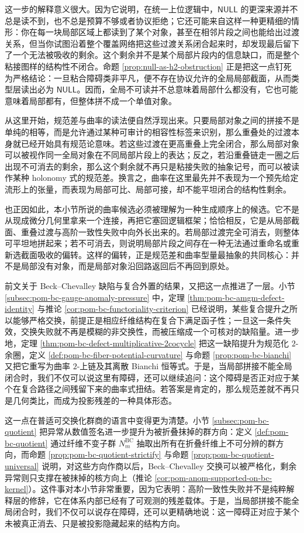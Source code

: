 这一步的解释意义很大。因为它说明，在统一上位逻辑中，\(\mathsf{NULL}\) 的更深来源并不总是读不到，也不总是预算不够或者协议拒绝；它还可能来自这样一种更精细的情形：你在每一块局部区域上都读到了某个对象，甚至在相邻片段之间也能给出过渡关系，但当你试图沿着整个覆盖网络把这些过渡关系闭合起来时，却发现最后留下了一个无法被吸收的剩余。这个剩余并不是某个局部片段内的信息缺口，而是整个粘接图样的结构性不闭合。命题 \ref{prop:null-as-h2-obstruction} 正是把这一点钉死为严格结论：一旦粘合障碍类非平凡，便不存在协议允许的全局局部截面，从而类型层读出必为 \(\mathsf{NULL}\)。因而，全局不可读并不总意味着局部什么都没有，它也可能意味着局部都有，但整体拼不成一个单值对象。

从这里开始，规范差与曲率的读法便自然浮现出来。只要局部对象之间的拼接不是单纯的相等，而是允许通过某种可审计的相容性标签来识别，那么重叠处的过渡本身就已经开始具有规范论意味。若这些过渡在更高重叠上完全闭合，那么局部对象可以被视作同一全局对象在不同局部片段上的表达；反之，若沿重叠链走一圈之后出现不可消去的剩余，那么这个剩余就不再只是粘接失败的抽象记号，而可以被读作某种 holonomy 式的规范差。换言之，曲率在这里最先并不表现为一个预先给定流形上的张量，而表现为局部可比、局部可接，却不能平坦闭合的结构性剩余。

也正因如此，本小节所说的曲率候选必须被理解为一种生成顺序上的候选。它不是从现成微分几何里拿来一个连接，再把它塞回逻辑框架；恰恰相反，它是从局部截面、重叠过渡与高阶一致性失败中向外长出来的。若局部过渡完全可消去，则整体可平坦地拼起来；若不可消去，则说明局部片段之间存在一种无法通过重命名或重新选截面吸收的偏转。这样的偏转，正是规范差和曲率型量最抽象的共同核心：并不是局部没有对象，而是局部对象沿回路返回后不再回到原处。

前文关于 Beck--Chevalley 缺陷与复合外置的结果，又把这一点推进了一层。小节 \ref{subsec:pom-bc-gauge-anomaly-pressure} 中，定理 \ref{thm:pom-bc-amgm-defect-identity} 与推论 \ref{cor:pom-bc-functoriality-criterion} 已经说明，某些复合提升之所以能够严格交换，前提正是相应纤维结构在复合下满足函子性；一旦这一条件失效，交换失败就不再是模糊的非交换性，而被压缩成一个可核对的缺陷量。进一步地，定理 \ref{thm:pom-bc-defect-multiplicative-2cocycle} 把这一缺陷提升为规范化 \(2\)-余圈，定义 \ref{def:pom-bc-fiber-potential-curvature} 与命题 \ref{prop:pom-bc-bianchi} 又把它重写为曲率 \(2\)-上链及其离散 Bianchi 恒等式。于是，当局部拼接不能全局闭合时，我们不仅可以说这里有障碍，还可以继续追问：这个障碍是否正对应于某个在复合路径之间残留下来的曲率式扭结。若答案是肯定的，那么规范差就不再只是几何类比，而成为投影残差的一种具体形态。

这一点在普适可交换化群商的语言中变得更为清楚。小节 \ref{subsec:pom-bc-quotient} 把异常从数值签名进一步提升为被折叠抹掉的群方向：定义 \ref{def:pom-bc-quotient} 通过纤维不变子群 \(N_m^{\mathrm{BC}}\) 抽取出所有在折叠纤维上不可分辨的群方向，而命题 \ref{prop:pom-bc-quotient-strictify} 与命题 \ref{prop:pom-bc-quotient-universal} 说明，对这些方向作商以后，Beck--Chevalley 交换可以被严格化，剩余异常则只支撑在被抹掉的核方向上（推论 \ref{cor:pom-anom-supported-on-bc-kernel}）。这件事对本小节非常重要，因为它表明：高阶一致性失败并不是纯粹解释层的修辞，它在体系内部已经有了可观测的残差载体。于是，当局部拼接不能全局闭合时，我们不仅可以说存在障碍，还可以更精确地说：这一障碍正对应于某个未被真正消去、只是被投影隐藏起来的结构方向。

